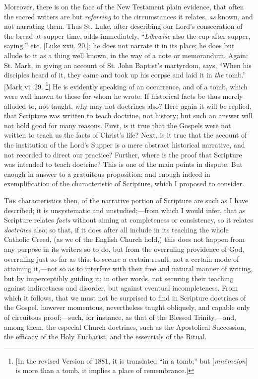 Moreover, there is on the face of the New Testament plain evidence,
that often the sacred writers are but \emph{referring} to the
circumstances it relates, \emph{as} known, and not narrating
them. Thus St. Luke, after describing our Lord's consecration of the
bread at supper time, adds immediately, ``\emph{Likewise} also the
cup after supper, saying,'' etc. [Luke xxii. 20.]; he does not
narrate it in its place; he does but allude to it as a thing well
known, in the way of a note or memorandum. Again: St. Mark, in giving
an account of St. John Baptist's martyrdom, says, ``When his
disciples heard of it, they came and took up his corpse and laid it in
\emph{the} tomb.'' [Mark vi. 29. \footnote{[In the revised Version of 1881, it is translated ``in a
tomb;'' but [\emph{mn\={e}meion}] is more than a tomb, it implies a place of remembrance.]}]
He is evidently speaking of an occurrence, and of a tomb, which were
well known to those for whom he wrote. If historical facts be thus
merely alluded to, not taught, why may not doctrines also? Here again
it will be replied, that Scripture was written to teach doctrine, not
history; but such an answer will not hold good for many reasons.
First, is it true that the Gospels were not written to teach us the
facts of Christ's life? Next, is it true that the account of the
institution of the Lord's Supper is a mere abstract historical
narrative, and not recorded to direct our practice? Further, where is
the proof that Scripture was intended to teach doctrine? This is one
of the main points in dispute. But enough in answer to a gratuitous
proposition; and enough indeed in exemplification of the
characteristic of Scripture, which I proposed to consider.


T\textsc{he} characteristics then, of the narrative portion of
Scripture are such as I have described; it is unsystematic and
unstudied;—from which I would infer, that as Scripture relates \emph{facts}
without aiming at completeness or consistency, so it relates \emph{doctrines}
also; so that, if it does after all include in its teaching the whole
Catholic Creed, (as we of the English Church hold,) this does not
happen from any purpose in its writers so to do, but from the
overruling providence of God, overruling just so far as this: to
secure a certain result, not a certain mode of attaining it,—not so
as to interfere with their free and natural manner of writing, but by
imperceptibly guiding it; in other words, not securing their teaching
against indirectness and disorder, but against eventual
incompleteness. From which it follows, that we must not be surprised
to find in Scripture doctrines of the Gospel, however momentous,
nevertheless taught obliquely, and capable only of circuitous proof;—such,
for instance, as that of the Blessed Trinity,—and, among them, the
especial Church doctrines, such as the Apostolical Succession, the
efficacy of the Holy Eucharist, and the essentials of the Ritual.

